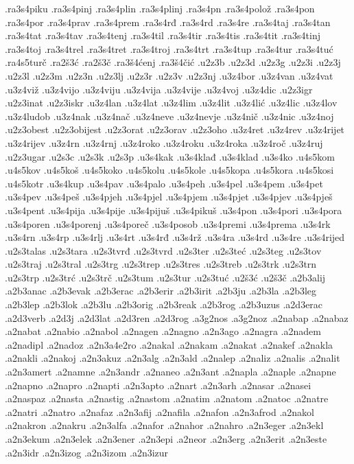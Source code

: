 {.ra3s4piku
.ra3s4pinj
.ra3s4plin
.ra3s4plinj
.ra3s4pn
.ra3s4polož
.ra3s4pon
.ra3s4por
.ra3s4prav
.ra3s4prem
.ra3s4rđ
.ra3s4rd
.ra3s4re
.ra3s4taj
.ra3s4tan
.ra3s4tat
.ra3s4tav
.ra3s4tenj
.ra3s4til
.ra3s4tir
.ra3s4tis
.ra3s4tit
.ra3s4tinj
.ra3s4toj
.ra3s4trel
.ra3s4tret
.ra3s4troj
.ra3s4trt
.ra3s4tup
.ra3s4tur
.ra3s4tuć
.ra4s5turč
.ra2š3ć
.ra2š3č
.ra3š4ćenj
.ra3š4čić
.u2z3b
.u2z3d
.u2z3g
.u2z3i
.u2z3j
.u2z3l
.u2z3m
.u2z3n
.u2z3lj
.u2z3r
.u2z3v
.u2z3nj
.u3z4bor
.u3z4van
.u3z4vat
.u3z4viž
.u3z4vijo
.u3z4viju
.u3z4vija
.u3z4vije
.u3z4voj
.u3z4dic
.u2z3igr
.u2z3inat
.u2z3iskr
.u3z4lan
.u3z4lat
.u3z4lim
.u3z4lit
.u3z4lić
.u3z4lic
.u3z4lov
.u3z4ludob
.u3z4nak
.u3z4nač
.u3z4neve
.u3z4nevje
.u3z4nič
.u3z4nic
.u3z4noj
.u2z3obest
.u2z3obijest
.u2z3orat
.u2z3orav
.u2z3oho
.u3z4ret
.u3z4rev
.u3z4rijet
.u3z4rijev
.u3z4rn
.u3z4rnj
.u3z4roko
.u3z4roku
.u3z4roka
.u3z4roč
.u3z4ruj
.u2z3ugar
.u2s3c
.u2s3k
.u2s3p
.u3s4kak
.u3s4klađ
.u3s4klad
.u3s4ko
.u4s5kom
.u4s5kov
.u4s5koš
.u4s5koko
.u4s5kolu
.u4s5kole
.u4s5kopa
.u4s5kora
.u4s5kosi
.u4s5kotr
.u3s4kup
.u3s4pav
.u3s4palo
.u3s4peh
.u3s4pel
.u3s4pem
.u3s4pet
.u3s4pev
.u3s4peš
.u3s4pjeh
.u3s4pjel
.u3s4pjem
.u3s4pjet
.u3s4pjev
.u3s4pješ
.u3s4pent
.u3s4pija
.u3s4pije
.u3s4pijuš
.u3s4pikuš
.u3s4pon
.u3s4pori
.u3s4pora
.u3s4poren
.u3s4porenj
.u3s4poreč
.u3s4posob
.u3s4premi
.u3s4prema
.u3s4rk
.u3s4rn
.u3s4rp
.u3s4rlj
.u3s4rt
.u3s4rđ
.u3s4rž
.u3s4ra
.u3s4rd
.u3s4re
.u3s4rijed
.u2s3talas
.u2s3tara
.u2s3tvrđ
.u2s3tvrd
.u2s3ter
.u2s3teć
.u2s3teg
.u2s3tov
.u2s3traj
.u2s3tral
.u2s3trg
.u2s3trep
.u2s3tres
.u2s3treb
.u2s3trk
.u2s3trn
.u2s3trp
.u2s3trć
.u2s3trč
.u2s3tum
.u2s3tur
.u2s3tuć
.u2š3ć
.u2š3č
.a2b3alij
.a2b3anac
.a2b3evak
.a2b3erac
.a2b3erir
.a2b3irit
.a2b3ju
.a2b3la
.a2b3leg
.a2b3lep
.a2b3lok
.a2b3lu
.a2b3orig
.a2b3reak
.a2b3rog
.a2b3uzus
.a2d3erac
.a2d3verb
.a2d3j
.a2d3lat
.a2d3ren
.a2d3rog
.a3g2nos
.a3g2noz
.a2nabap
.a2nabaz
.a2nabat
.a2nabio
.a2nabol
.a2nagen
.a2nagno
.a2n3ago
.a2nagra
.a2nadem
.a2nadipl
.a2nadoz
.a2n3a4e2ro
.a2nakal
.a2nakam
.a2nakat
.a2nakef
.a2nakla
.a2nakli
.a2nakoj
.a2n3akuz
.a2n3alg
.a2n3ald
.a2nalep
.a2naliz
.a2nalis
.a2nalit
.a2n3amert
.a2namne
.a2n3andr
.a2naneo
.a2n3ant
.a2napla
.a2naple
.a2napne
.a2napno
.a2napro
.a2napti
.a2n3apto
.a2nart
.a2n3arh
.a2nasar
.a2nasei
.a2naspaz
.a2nasta
.a2nastig
.a2nastom
.a2natim
.a2natom
.a2natoc
.a2natre
.a2natri
.a2natro
.a2nafaz
.a2n3afij
.a2nafila
.a2nafon
.a2n3afrod
.a2nakol
.a2nakron
.a2nakru
.a2n3alfa
.a2nafor
.a2nahor
.a2nahro
.a2n3eger
.a2n3ekl
.a2n3ekum
.a2n3elek
.a2n3ener
.a2n3epi
.a2neor
.a2n3erg
.a2n3erit
.a2n3este
.a2n3idr
.a2n3izog
.a2n3izom
.a2n3izur
}
